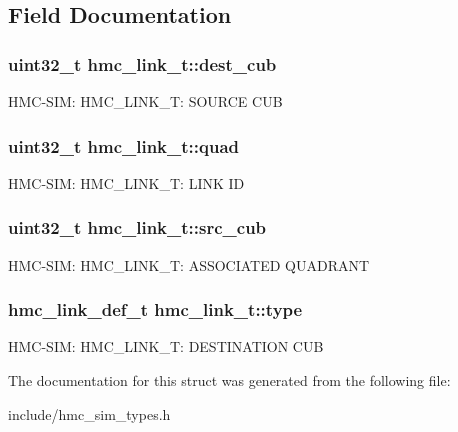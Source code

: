 \subsection{Field Documentation}
\hypertarget{structhmc__link__t_addb5467768ff0fc1f58b06b5db27050f}{
\subsubsection[{dest\-\_\-cub}]{\setlength{\rightskip}{0pt plus 5cm}uint32\-\_\-t hmc\-\_\-link\-\_\-t\-::dest\-\_\-cub}}\label{structhmc__link__t_addb5467768ff0fc1f58b06b5db27050f}
H\-M\-C-\/\-S\-I\-M\-: H\-M\-C\-\_\-\-L\-I\-N\-K\-\_\-\-T\-: S\-O\-U\-R\-C\-E C\-U\-B \hypertarget{structhmc__link__t_afb76b04d4e00b7d2f427b366f74d93f7}{
\subsubsection[{quad}]{\setlength{\rightskip}{0pt plus 5cm}uint32\-\_\-t hmc\-\_\-link\-\_\-t\-::quad}}\label{structhmc__link__t_afb76b04d4e00b7d2f427b366f74d93f7}
H\-M\-C-\/\-S\-I\-M\-: H\-M\-C\-\_\-\-L\-I\-N\-K\-\_\-\-T\-: L\-I\-N\-K I\-D \hypertarget{structhmc__link__t_a79d6284c61c12019421d79dd355cb461}{
\subsubsection[{src\-\_\-cub}]{\setlength{\rightskip}{0pt plus 5cm}uint32\-\_\-t hmc\-\_\-link\-\_\-t\-::src\-\_\-cub}}\label{structhmc__link__t_a79d6284c61c12019421d79dd355cb461}
H\-M\-C-\/\-S\-I\-M\-: H\-M\-C\-\_\-\-L\-I\-N\-K\-\_\-\-T\-: A\-S\-S\-O\-C\-I\-A\-T\-E\-D Q\-U\-A\-D\-R\-A\-N\-T \hypertarget{structhmc__link__t_a5aa05931275099889daaab6641a2844d}{
\subsubsection[{type}]{\setlength{\rightskip}{0pt plus 5cm}hmc\-\_\-link\-\_\-def\-\_\-t hmc\-\_\-link\-\_\-t\-::type}}\label{structhmc__link__t_a5aa05931275099889daaab6641a2844d}
H\-M\-C-\/\-S\-I\-M\-: H\-M\-C\-\_\-\-L\-I\-N\-K\-\_\-\-T\-: D\-E\-S\-T\-I\-N\-A\-T\-I\-O\-N C\-U\-B 

The documentation for this struct was generated from the following file\-:\begin{DoxyCompactItemize}
\item 
include/hmc\-\_\-sim\-\_\-types.\-h\end{DoxyCompactItemize}
